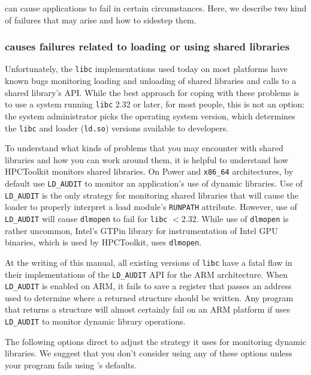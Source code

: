 \hpcrun{} can cause applications to fail in certain circumstances. Here, we describe two kind of failures that may arise and how to sidestep them.

\subsubsection{\hpcrun{} causes failures related to loading or using shared libraries}
\label{hpcrun-audit}

Unfortunately, the {\tt libc} implementations used today on most platforms have known bugs monitoring loading and unloading of shared libraries and calls to a shared library's API. 
While the best approach for coping with these problems is to use a system running  {\tt libc}  2.32 or later, for most people, this is not an option: 
the system administrator picks the operating system version, which determines the {\tt libc} and loader ({\tt ld.so}) versions available to developers.

To understand what kinds of problems that you may encounter with shared libraries and how you can work around them, it is helpful to understand how HPCToolkit monitors shared libraries. 
On Power and \verb|x86_64| architectures, by default \hpcrun{}  use \verb|LD_AUDIT| to monitor an application's use of dynamic libraries. 
Use of \verb|LD_AUDIT|  is the only  strategy for monitoring shared libraries that will cause the loader to properly interpret a load module's
 \verb|RUNPATH| attribute. However, use of \verb|LD_AUDIT|  will cause {\tt dlmopen} to fail  for {\tt libc} $< 2.32$. 
While use of {\tt dlmopen} is rather uncommon, Intel's GTPin library for instrumentation of Intel GPU binaries, which is used by HPCToolkit, uses {\tt dlmopen}. 


At the writing of this manual, all existing versions of {\tt libc} have a fatal flaw in their implementations of the \verb|LD_AUDIT| API for the ARM architecture. 
When \verb|LD_AUDIT|  is enabled on ARM, it fails to save a register that passes an address used to determine where a returned structure should be written. 
Any  program that returns a structure will almost certainly fail on an ARM platform if \hpcrun{} uses \verb|LD_AUDIT| to monitor dynamic library operations. 

The following options direct \hpcrun{} to adjust the strategy it uses for monitoring dynamic libraries. We suggest that you don't consider using any of these options unless your program fails using \hpcrun{}'s defaults.

